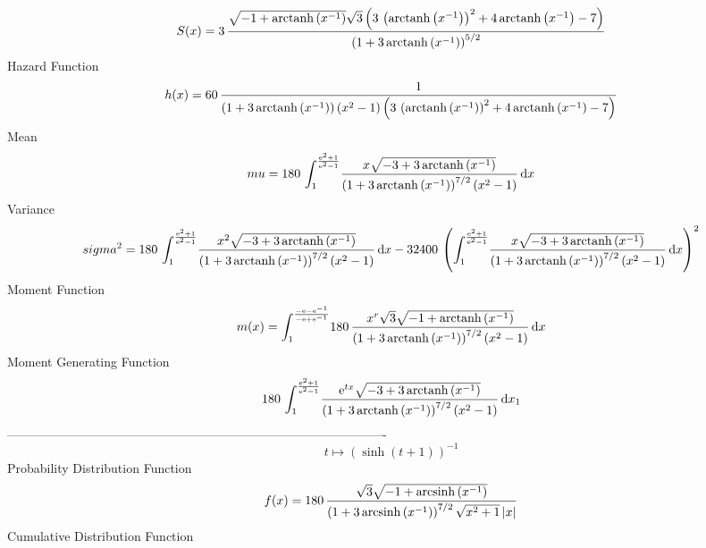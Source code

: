 \documentclass[12pt]{article}
\begin{document}
 $$ S(x)=3\,{\frac {\sqrt {-1+{\rm arctanh} \left({x}^{-1}\right)}\sqrt {3}
 \left( 3\, \left( {\rm arctanh} \left({x}^{-1}\right) \right) ^{2}+4
\,{\rm arctanh} \left({x}^{-1}\right)-7 \right) }{ \left( 1+3\,
{\rm arctanh} \left({x}^{-1}\right) \right) ^{5/2}}}
$$ Hazard Function 
 $$ h(x)=60\,{\frac {1}{ \left( 1+3\,{\rm arctanh} \left({x}^{-1}\right)
 \right)  \left( {x}^{2}-1 \right)  \left( 3\, \left( {\rm arctanh} 
\left({x}^{-1}\right) \right) ^{2}+4\,{\rm arctanh} \left({x}^{-1}
\right)-7 \right) }}
$$Mean 
 $$ mu=180\,\int_{1}^{{\frac {{{\rm e}^{2}}+1}{{{\rm e}^{2}}-1}}}\!{\frac {x
\sqrt {-3+3\,{\rm arctanh} \left({x}^{-1}\right)}}{ \left( 1+3\,
{\rm arctanh} \left({x}^{-1}\right) \right) ^{7/2} \left( {x}^{2}-1
 \right) }}\,{\rm d}x
$$ Variance 
 $$ sigma^2 = 180\,\int_{1}^{{\frac {{{\rm e}^{2}}+1}{{{\rm e}^{2}}-1}}}\!{\frac {{x
}^{2}\sqrt {-3+3\,{\rm arctanh} \left({x}^{-1}\right)}}{ \left( 1+3\,
{\rm arctanh} \left({x}^{-1}\right) \right) ^{7/2} \left( {x}^{2}-1
 \right) }}\,{\rm d}x-32400\, \left( \int_{1}^{{\frac {{{\rm e}^{2}}+1
}{{{\rm e}^{2}}-1}}}\!{\frac {x\sqrt {-3+3\,{\rm arctanh} \left({x}^{-
1}\right)}}{ \left( 1+3\,{\rm arctanh} \left({x}^{-1}\right) \right) ^
{7/2} \left( {x}^{2}-1 \right) }}\,{\rm d}x \right) ^{2}
$$Moment Function 
 $$ m(x) = \int_{1}^{{\frac {-{\rm e}-{{\rm e}^{-1}}}{-{\rm e}+{{\rm e}^{-1}}}}}
\!180\,{\frac {{x}^{r}\sqrt {3}\sqrt {-1+{\rm arctanh} \left({x}^{-1}
\right)}}{ \left( 1+3\,{\rm arctanh} \left({x}^{-1}\right) \right) ^{7
/2} \left( {x}^{2}-1 \right) }}\,{\rm d}x
$$ Moment Generating Function 
 $$180\,\int_{1}^{{\frac {{{\rm e}^{2}}+1}{{{\rm e}^{2}}-1}}}\!{\frac {{
{\rm e}^{tx}}\sqrt {-3+3\,{\rm arctanh} \left({x}^{-1}\right)}}{
 \left( 1+3\,{\rm arctanh} \left({x}^{-1}\right) \right) ^{7/2}
 \left( {x}^{2}-1 \right) }}\,{\rm d}x_{{1}}
$$-------------------------------------------------------------------------------------------  \\$$t\mapsto  \left( \sinh \left( t+1 \right)  \right) ^{-1}
$$Probability Distribution Function 
$$  f(x)=180\,{\frac {\sqrt {3}\sqrt {-1+{\rm arcsinh} \left({x}^{-1}\right)}}{
 \left( 1+3\,{\rm arcsinh} \left({x}^{-1}\right) \right) ^{7/2}\sqrt {
{x}^{2}+1} \left| x \right| }}
$$Cumulative Distribution Function  
\end{document}
